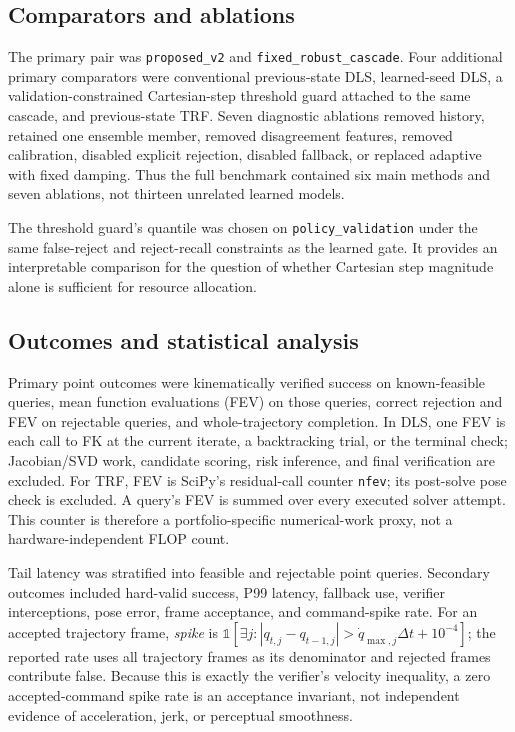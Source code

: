 \documentclass[10pt,a4paper]{article}
\begin{document}
\subsection{Comparators and ablations}

The primary pair was \texttt{proposed\_v2} and
\texttt{fixed\_robust\_cascade}. Four additional primary comparators were conventional
previous-state DLS, learned-seed DLS, a validation-constrained Cartesian-step threshold
guard attached to the same cascade, and previous-state TRF. Seven diagnostic ablations
removed history, retained one ensemble member, removed disagreement features, removed
calibration, disabled explicit rejection, disabled fallback, or replaced adaptive with
fixed damping. Thus the full benchmark contained six main methods and seven ablations,
not thirteen unrelated learned models.

The threshold guard's quantile was chosen on \texttt{policy\_validation} under the same
false-reject and reject-recall constraints as the learned gate. It provides an
interpretable comparison for the question of whether Cartesian step magnitude alone is
sufficient for resource allocation.

\subsection{Outcomes and statistical analysis}

Primary point outcomes were kinematically verified success on known-feasible queries,
mean function evaluations (FEV) on those queries, correct rejection and FEV on
rejectable queries, and whole-trajectory completion. In DLS, one FEV is each call to FK
at the current iterate, a backtracking trial, or the terminal check; Jacobian/SVD work,
candidate scoring, risk inference, and final verification are excluded. For TRF, FEV is
SciPy's residual-call counter \texttt{nfev}; its post-solve pose check is excluded. A
query's FEV is summed over every executed solver attempt. This counter is therefore a
portfolio-specific numerical-work proxy, not a hardware-independent FLOP count.

Tail latency was stratified into feasible and rejectable point queries. Secondary
outcomes included hard-valid success, P99 latency, fallback use, verifier interceptions,
pose error, frame acceptance, and command-spike rate. For an accepted trajectory frame,
\emph{spike} is
$\mathbb{1}[\exists j:|q_{t,j}-q_{t-1,j}|>\dot q_{\max,j}\Delta t+10^{-4}]$;
the reported rate uses all trajectory frames as its denominator and rejected frames
contribute false. Because this is exactly the verifier's velocity inequality, a zero
accepted-command spike rate is an acceptance invariant, not independent evidence of
acceleration, jerk, or perceptual smoothness.
\end{document}
